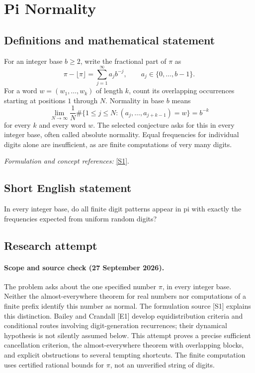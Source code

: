 \documentclass[11pt]{article}
\begin{document}
\section*{\texorpdfstring{Pi Normality}{Pi Normality}}\label{1502}
\subsection{Definitions and mathematical statement}
For an integer base $b\ge2$, write the fractional part of $\pi$ as
\[
 \pi-\lfloor\pi\rfloor=\sum_{j=1}^{\infty}a_jb^{-j},
 \qquad a_j\in\{0,\ldots,b-1\}.
\]
For a word $w=(w_1,\ldots,w_k)$ of length $k$, count its overlapping occurrences starting at positions $1$ through $N$. Normality in base $b$ means
\[
 \lim_{N\to\infty}\frac1N
 \#\{1\le j\le N:(a_j,\ldots,a_{j+k-1})=w\}=b^{-k}
\]
for every $k$ and every word $w$. The selected conjecture asks for this in every integer base, often called absolute normality. Equal frequencies for individual digits alone are insufficient, as are finite computations of very many digits.
\par\smallskip\textit{Formulation and concept references:} \href{https://www.claymath.org/library/annual_report/ar2006/06report_normalnumbers.pdf}{[S1]}.

\subsection{Short English statement}
In every integer base, do all finite digit patterns appear in pi with exactly the frequencies expected from uniform random digits?
\subsection{Research attempt}
\paragraph{Scope and source check (27 September 2026).}
The problem asks about the one specified number $\pi$, in every integer base. Neither the almost-everywhere theorem for real numbers nor computations of a finite prefix identify this number as normal. The formulation source [S1] explains this distinction. Bailey and Crandall [E1] develop equidistribution criteria and conditional routes involving digit-generation recurrences; their dynamical hypothesis is not silently assumed below. This attempt proves a precise sufficient cancellation criterion, the almost-everywhere theorem with overlapping blocks, and explicit obstructions to several tempting shortcuts. The finite computation uses certified rational bounds for $\pi$, not an unverified string of digits.
\end{document}
